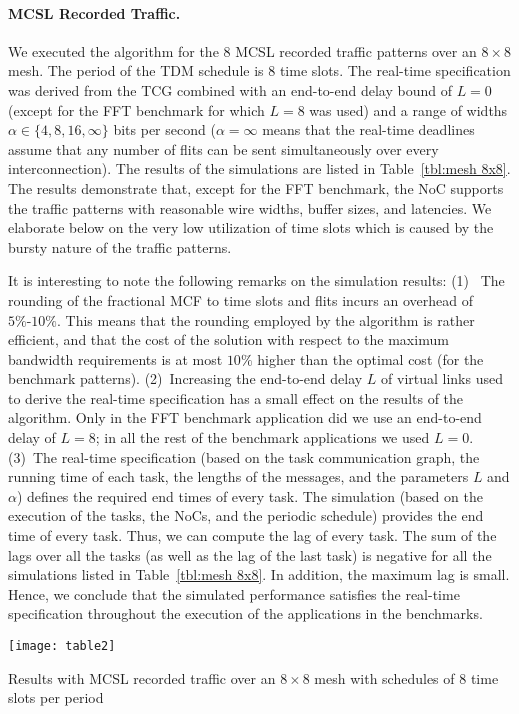 \documentclass[a4paper,12pt]{article}
\newenvironment{proof sketch}[1]{\noindent {\emph{Proof sketch of #1:}}}{\hfill \qed}
\begin{document}
\paragraph{MCSL Recorded Traffic.}  We executed the algorithm for the $8$ MCSL recorded
traffic patterns over an $8\times 8$ mesh. The period of the TDM schedule is $8$ time
slots. The real-time specification was derived from the TCG combined with an
end-to-end delay bound of $L=0$ (except for the FFT benchmark for which $L=8$ was
used) and a range of widths $\alpha\in\{4,8,16,\infty\}$ bits per second
($\alpha=\infty$ means that the real-time deadlines assume that any number of flits
can be sent simultaneously over every interconnection). The results of the
simulations are listed in Table~\ref{tbl:mesh 8x8}.  The results demonstrate that,
except for the FFT benchmark, the NoC supports the traffic patterns with reasonable
wire widths, buffer sizes, and latencies.  We elaborate below on the very low
utilization of time slots which is caused by the bursty nature of the traffic
patterns.

It is interesting to note the following remarks on the simulation results: (1)~ The
rounding of the fractional MCF to time slots and flits incurs an overhead of
$5\%\text{-} 10\%$.  This means that the rounding employed by the algorithm is rather
efficient, and that the cost of the solution with respect to the maximum bandwidth
requirements is at most $10\%$ higher than the optimal cost (for the benchmark
patterns).
%
(2)~Increasing the end-to-end delay $L$ of virtual links used to derive the real-time
specification has a small effect on the results of the algorithm. Only in the FFT benchmark
application did we use an end-to-end delay of $L=8$; in all the rest of the benchmark
applications we used $L=0$.
%
(3)~The real-time specification (based on the task communication graph, the running
time of each task, the lengths of the messages, and the parameters $L$ and $\alpha$)
defines the required end times of every task.  The simulation (based on the execution
of the tasks, the NoCs, and the periodic schedule) provides the end time of every
task. Thus, we can compute the lag of every task.  The sum of the lags over all the
tasks (as well as the lag of the last task) is negative for all the simulations
listed in Table~\ref{tbl:mesh 8x8}. In addition, the maximum lag is small. Hence, we
conclude that the simulated performance satisfies the real-time specification
throughout the execution of the applications in the benchmarks.

%
\begin{table}
{\centering\texttt{[image: table2]}}
  \caption{Results with MCSL recorded traffic over an $8\times 8$ mesh with schedules
    of $8$ time slots per period}
\label{tbl:mesh 8x8}
\end{table}
\end{document}
